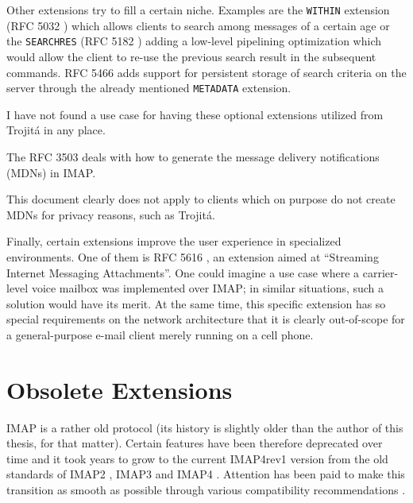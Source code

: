 \documentclass[trojita]{subfiles}
\begin{document}
Other extensions try to fill a certain niche.  Examples are the {\tt WITHIN} extension (RFC 5032 \cite{rfc5032}) which
allows clients to search among messages of a certain age or the {\tt SEARCHRES} (RFC 5182 \cite{rfc5182}) adding a
low-level pipelining optimization which would allow the client to re-use the previous search result in the subsequent
commands.  RFC 5466 \cite{rfc5466} adds support for persistent storage of search criteria on the server through the
already mentioned {\tt METADATA} extension.

\begin{trojitabehavior}
I have not found a use case for having these optional extensions utilized from Trojitá in any place.
\end{trojitabehavior}

The RFC 3503 \cite{rfc3503} deals with how to generate the message delivery notifications (MDNs) in IMAP.

\begin{trojitabehavior}
This document clearly does not apply to clients which on purpose do not create MDNs for privacy reasons, such as
Trojitá.
\end{trojitabehavior}

Finally, certain extensions improve the user experience in specialized environments.  One of them is RFC 5616
\cite{rfc5616}, an extension aimed at ``Streaming Internet Messaging Attachments''.  One could imagine a use case where
a carrier-level voice mailbox was implemented over IMAP; in similar situations, such a solution would have its merit.
At the same time, this specific extension has so special requirements on the network architecture that it is clearly
out-of-scope for a general-purpose e-mail client merely running on a cell phone.

\section{Obsolete Extensions}

IMAP is a rather old protocol (its history is slightly older than the author of this thesis, for that matter).  Certain
features have been therefore deprecated over time and it took years to grow to the current IMAP4rev1 version from the
old standards of IMAP2 \cite{rfc1064} \cite{rfc1176}, IMAP3 \cite{rfc1203} and IMAP4 \cite{rfc1730}.  Attention has been
paid to make this transition as smooth as possible through various compatibility recommendations \cite{rfc1732}
\cite{rfc2060} \cite{rfc2061} \cite{rfc2062}.
\end{document}
